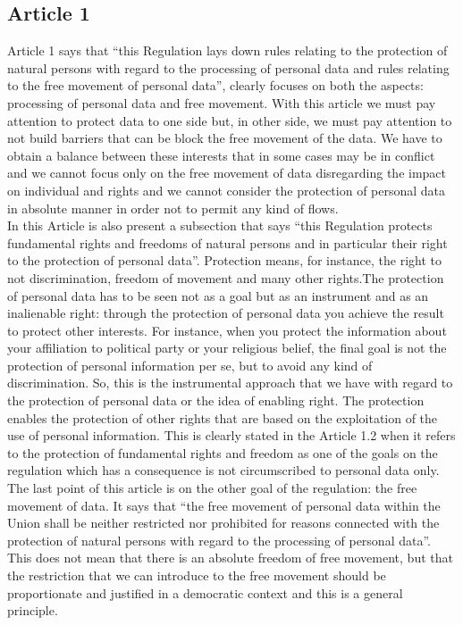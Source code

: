 \subsection{Article 1}
Article 1 says that “this Regulation lays down rules relating to the protection of natural persons with regard to the processing of personal data and rules relating to the free movement of personal data”, clearly focuses on both the aspects: processing of personal data and free movement. With this article we must pay attention to protect data to one side but, in other side, we must pay attention to not build barriers that can be block the free movement of the data. We have to obtain a balance between these interests that in some cases may be in conflict and we cannot focus only on the free movement of data disregarding the impact on individual and rights and we cannot consider the protection of personal data in absolute manner in order not to permit any kind of flows.\\
In this Article is also present a subsection that says “this Regulation protects fundamental rights and freedoms of natural persons and in particular their right to the protection of personal data”. Protection means, for instance, the right to not discrimination, freedom of movement and many other rights.The protection of personal data has to be seen not as a goal but as an instrument and as an inalienable right: through the protection of personal data you achieve the result to protect other interests. For instance, when you protect the information about your affiliation to political party or your religious belief, the final goal is not the protection of personal information per se, but to avoid any kind of discrimination. So, this is the instrumental approach that we have with regard to the protection of personal data or the idea of enabling right. The protection enables the protection of other rights that are based on the exploitation of the use of personal information. This is clearly stated in the Article 1.2 when it refers to the protection of fundamental rights and freedom as one of the goals on the regulation which has a consequence is not circumscribed to personal data only.\\
The last point of this article is on the other goal of the regulation: the free movement of data. It says that “the free movement of personal data within the Union shall be neither restricted nor prohibited for reasons connected with the protection of natural persons with regard to the processing of personal data”. This does not mean that there is an absolute freedom of free movement, but that the restriction that we can introduce to the free movement should be proportionate and justified in a democratic context and this is a general principle.
